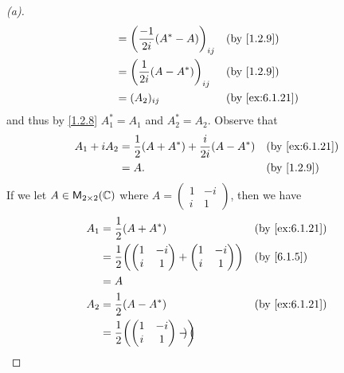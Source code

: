 \begin{proof}[(a)]
\begin{align*}
                                                      & = \pa{\frac{-1}{2i} (A^* - A)}_{i j}                  &  & \by{1.2.9}     \\
                                                      & = \pa{\frac{1}{2i} (A - A^*)}_{i j}                   &  & \by{1.2.9}     \\
                                                      & = (A_2)_{i j}                                         &  & \by{ex:6.1.21}
  \end{align*}
  and thus by \cref{1.2.8} \(A_1^* = A_1\) and \(A_2^* = A_2\).
  Observe that
  \begin{align*}
    A_1 + i A_2 & = \frac{1}{2} (A + A^*) + \frac{i}{2i} (A - A^*) &  & \by{ex:6.1.21} \\
                & = A.                                             &  & \by{1.2.9}
  \end{align*}
  If we let \(A \in \ms[2][2][\C]\) where \(A = \begin{pmatrix}
    1 & -i \\
    i & 1
  \end{pmatrix}\), then we have
  \begin{align*}
    A_1          & = \frac{1}{2} (A + A^*)           &  & \by{ex:6.1.21}            \\
                 & = \frac{1}{2} \pa{\begin{pmatrix}
                                         1 & -i \\
                                         i & 1
                                       \end{pmatrix} + \begin{pmatrix}
                                                         1 & -i \\
                                                         i & 1
                                                       \end{pmatrix}} &  & \by{6.1.5} \\
                 & = A                                                              \\
    A_2          & = \frac{1}{2} (A - A^*)           &  & \by{ex:6.1.21}            \\
                 & = \frac{1}{2} \pa{\begin{pmatrix}
                                         1 & -i \\
                                         i & 1
                                       \end{pmatrix} - \begin{pmatrix}

\end{pmatrix}}
\end{align*}
\end{proof}
